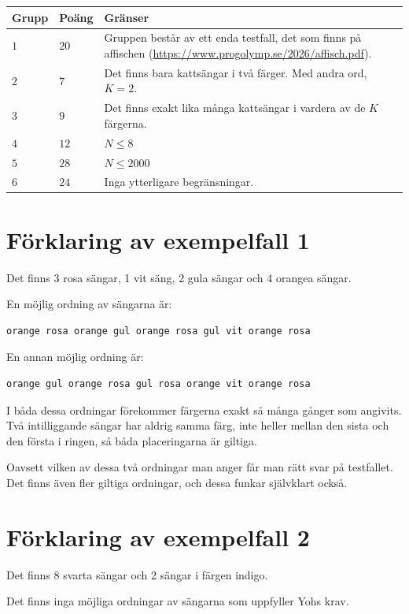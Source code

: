 \noindent
\begin{tabular}{| l | l | p{12cm} |}
  \hline
  \textbf{Grupp} & \textbf{Poäng} & \textbf{Gränser} \\ \hline
  $1$    & $20$       & Gruppen består av ett enda testfall, det som finns på affischen (\url{https://www.progolymp.se/2026/affisch.pdf}). \\ \hline
  $2$    & $7$        & Det finns bara kattsängar i två färger. Med andra ord, $K = 2$. \\ \hline
  $3$    & $9$        & Det finns exakt lika många kattsängar i vardera av de $K$ färgerna. \\ \hline
  $4$    & $12$       & $N \le 8$ \\ \hline
  $5$    & $28$       & $N \le 2000$ \\ \hline
  $6$    & $24$       & Inga ytterligare begränsningar. \\ \hline
\end{tabular}

\section*{Förklaring av exempelfall 1}
Det finns 3 rosa sängar, 1 vit säng, 2 gula sängar och 4 orangea sängar.

En möjlig ordning av sängarna är:
\begin{verbatim}
orange rosa orange gul orange rosa gul vit orange rosa
\end{verbatim}

En annan möjlig ordning är:
\begin{verbatim}
orange gul orange rosa gul rosa orange vit orange rosa
\end{verbatim}

I båda dessa ordningar förekommer färgerna exakt så många gånger som angivits.
Två intilliggande sängar har aldrig samma färg, inte heller mellan den sista och den första i ringen, så båda placeringarna är giltiga.

Oavsett vilken av dessa två ordningar man anger får man rätt svar på testfallet.
Det finns även fler giltiga ordningar, och dessa funkar självklart också.

\section*{Förklaring av exempelfall 2}
Det finns 8 svarta sängar och 2 sängar i färgen indigo.

Det finns inga möjliga ordningar av sängarna som uppfyller Yohs krav.


